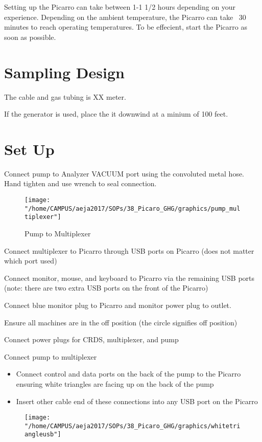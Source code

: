 \documentclass[12pt]{../SOP3}\usepackage[]{graphicx}\usepackage[]{color}
\begin{document}
\NP Setting up the Picarro can take between 1-1 1/2 hours depending on your experience. Depending on the ambient temperature, the Picarro can take ~30 minutes to reach operating temperatures. To be effecient, start the Picarro as soon as possible.

\section{Sampling Design}

\NP The cable and gas tubing is XX meter.

\NP If the generator is used, place the it downwind at a minium of 100 feet.

\section{Set Up}

\NP Connect pump to Analyzer VACUUM port using the convoluted metal hose. Hand tighten and use wrench to seal connection.

\NP 
\begin{figure}[h]
\texttt{[image: "/home/CAMPUS/aeja2017/SOPs/38\_Picaro\_GHG/graphics/pump\_multiplexer"]}
\caption{Pump to Multiplexer}
\end{figure}


\NP Connect multiplexer to Picarro through USB ports on Picarro (does not matter which port used)

\NP Connect monitor, mouse, and keyboard to Picarro via the remaining USB ports (note: there are two extra USB ports on the front of the Picarro)

\NP Connect blue monitor plug to Picarro and monitor power plug to outlet.

\NP Ensure all machines are in the off position (the circle signifies off position)

\NP Connect power plugs for CRDS, multiplexer, and pump

\NP Connect pump to multiplexer
\begin{itemize}
\item Connect control and data ports on the back of the pump to the Picarro ensuring white triangles are facing up on the back of the pump
\item Insert other cable end of these connections into any USB port on the Picarro
\end{itemize}

\begin{figure}
\texttt{[image: "/home/CAMPUS/aeja2017/SOPs/38\_Picaro\_GHG/graphics/whitetriangleusb"]}
\end{figure}
\end{document}
